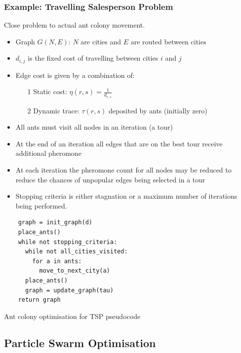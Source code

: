 \documentclass[a4paper]{article}
\begin{document}
\subsubsection{Example: Travelling Salesperson Problem}

Close problem to actual ant colony movement.

\begin{itemize}
  \item Graph $G(N, E)$: $N$ are cities and $E$ are routed between cities
  \item $d_{i,j}$ is the fixed cost of travelling between cities $i$ and $j$
  \item Edge cost is given by a combination of:
    \begin{enumerate}
      \item[1] Static cost: $\eta(r, s) = \frac{1}{d_{r,s}}$
      \item[2] Dynamic trace: $\tau(r, s)$ deposited by ants (initially zero)
    \end{enumerate}
  \item All ants must visit all nodes in an iteration (a tour)
  \item At the end of an iteration all edges that are on the best tour receive
        additional pheromone
  \item At each iteration the pheromone count for all nodes may be reduced to
        reduce the chances of unpopular edges being selected in a tour
  \item Stopping criteria is either stagnation or a maximum number of iterations
    being performed.
\end{itemize}


\begin{listing}[h]
  \begin{verbatim}
    graph = init_graph(d)
    place_ants()
    while not stopping_criteria:
      while not all_cities_visited:
        for a in ants:
          move_to_next_city(a)
      place_ants()
      graph = update_graph(tau)
    return graph
  \end{verbatim}
  \caption{Ant colony optimisation for TSP pseudocode}
  \label{listing:aco_for_tsp_pseudocode}
\end{listing}
\FloatBarrier

\subsection{Particle Swarm Optimisation}
\end{document}
